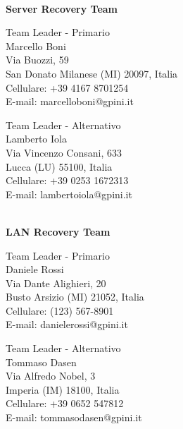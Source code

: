 \documentclass[12pt, a4paper, titlepage]{report}
\begin{document}
	\vspace{0.5cm}
	\centerline{\textbf{\\Server Recovery Team}}
	\begin{paracol}{2}
		\setlength{\columnsep}{5em}
		\begin{leftcolumn}
			\begin{adjustwidth}{0.5cm}{}
				Team Leader - Primario \\
				Marcello Boni \\ 
				Via Buozzi, 59 \\ 
				San Donato Milanese (MI) 20097, Italia \\
				Cellulare:  +39 4167 8701254 \\
				E-mail:  marcelloboni@gpini.it 
			\end{adjustwidth}
		\end{leftcolumn}
		\begin{rightcolumn}
			\begin{adjustwidth}{0.5cm}{}
				Team Leader - Alternativo \\
				Lamberto Iola\\
				Via Vincenzo Consani, 633\\ 
				Lucca (LU) 55100, Italia \\
				Cellulare:  +39 0253 1672313 \\
				E-mail: lambertoiola@gpini.it 
			\end{adjustwidth}
		\end{rightcolumn}
	\end{paracol} 
	
	\vspace{0.5cm}
	\centerline{\textbf{\\LAN Recovery Team}}
	\begin{paracol}{2}
		\setlength{\columnsep}{5em}
		\begin{leftcolumn}
			\begin{adjustwidth}{0.5cm}{}
				Team Leader - Primario \\
				Daniele Rossi \\
				Via Dante Alighieri, 20\\
				Busto Arsizio (MI) 21052, Italia\\ 
				Cellulare:  (123) 567-8901 \\
				E-mail:  danielerossi@gpini.it 
			\end{adjustwidth}
		\end{leftcolumn}
		\begin{rightcolumn}
			\begin{adjustwidth}{0.5cm}{}
				Team Leader - Alternativo \\
				Tommaso Dasen\\
				Via Alfredo Nobel, 3\\ 
				Imperia (IM) 18100, Italia \\
				Cellulare:  +39 0652 547812 \\
				E-mail: tommasodasen@gpini.it 
			\end{adjustwidth}
		\end{rightcolumn}
	\end{paracol}
	
\end{document}
